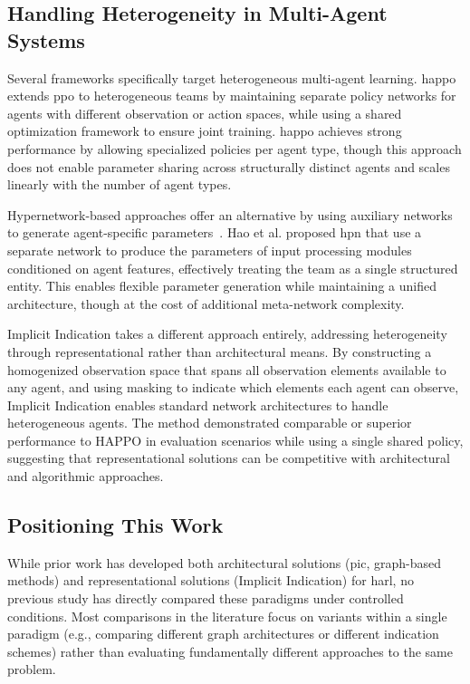 \subsection{Handling Heterogeneity in Multi-Agent Systems}

Several frameworks specifically target heterogeneous multi-agent learning. 
\Gls{happo}~\cite{zhong2024} extends \gls{ppo} to heterogeneous 
teams by maintaining separate policy networks for agents with different observation 
or action spaces, while using a shared optimization framework to ensure joint training. 
\Gls{happo} achieves strong performance by allowing specialized policies per agent type, 
though this approach does not enable parameter sharing across structurally distinct 
agents and scales linearly with the number of agent types.

Hypernetwork-based approaches offer an alternative by using auxiliary 
networks to generate agent-specific parameters~\cite{hao2023}. 
Hao et al. proposed \gls{hpn} that use a separate network to produce 
the parameters of input processing modules conditioned on agent features, 
effectively treating the team as a single structured entity. 
This enables flexible parameter generation while maintaining a unified architecture, 
though at the cost of additional meta-network complexity.

Implicit Indication%
takes a different approach entirely, 
addressing heterogeneity through representational rather than architectural means. 
By constructing a homogenized observation space that spans all 
observation elements available to any agent, and using masking to 
indicate which elements each agent can observe, 
Implicit Indication enables standard network architectures to handle heterogeneous agents. 
The method demonstrated comparable or superior performance to HAPPO in evaluation scenarios 
while using a single shared policy, suggesting that representational solutions can be 
competitive with architectural and algorithmic approaches.

\subsection{Positioning This Work}

While prior work has developed both architectural solutions (\gls{pic}, graph-based methods) 
and representational solutions (Implicit Indication) for \gls{harl}, 
no previous study has directly compared these paradigms under controlled conditions. 
Most comparisons in the literature focus on variants within a single paradigm 
(e.g., comparing different graph architectures or different indication schemes) 
rather than evaluating fundamentally different approaches to the same problem.

